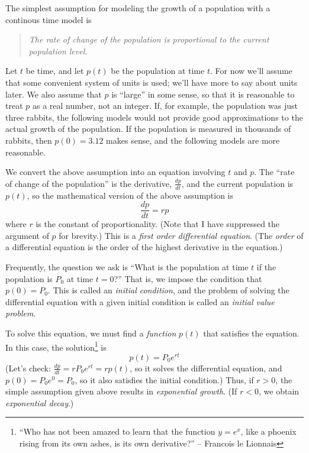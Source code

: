 \documentclass[reqno]{immbook}
\numberwithin{equation}{chapter}
\numberwithin{question}{section}
\numberwithin{theorem}{chapter}
\numberwithin{figure}{chapter}
\theoremstyle{definition}
\begin{document}
% 
% 
The simplest assumption for modeling the growth of a population
with a continous time model is
\begin{quote}
\emph{The rate of change of the population is proportional to the current population level.}
\end{quote} 
Let $t$ be time, and let $p(t)$ be the population at time $t$.
For now we'll assume that some convenient system of units is used;
we'll have more to say about units later.
We also assume that $p$ is ``large'' in some sense, so that it is reasonable
to treat $p$ as a real number, not an integer.
If, for example, the population was just three rabbits, the following
models would not provide good
approximations to the actual growth of the population.
If the population is measured in thousands of rabbits,
then $p(0)=3.12$ makes sense,
and the following models are more reasonable.

We convert the above assumption into an equation involving $t$
and $p$.
The ``rate of change of the population'' is the derivative, $\frac{dp}{dt}$, and the
current population is $p(t)$, so the mathematical version of the above
assumption is
\begin{equation}
  \frac{dp}{dt} = rp
\label{eqn:growth}
\end{equation}
where $r$ is the constant of proportionality.
(Note that I have suppressed the argument of $p$ for brevity.)
This is a \emph{first order differential equation}.
(The \emph{order} of a differential equation is the order of the
highest derivative in the equation.)

Frequently, the question we ask is ``What is the population at time $t$
if the population is $P_0$ at time $t=0$?''  That is, we impose the
condition that $p(0)=P_0$.  This is called an
\emph{initial condition}, and the problem of solving the differential
equation with a given initial condition is called an
\emph{initial value problem}.

To solve this equation, we must find a \emph{function} $p(t)$
that satisfies the equation.  In this case, the solution\footnote{%
``Who has not been amazed to learn that the function $y = e^x$, like a 
      phoenix rising from its own ashes, is its own derivative?'' 
       -- Francois le Lionnais
}
is
\begin{equation}
  p(t) = P_0 e^{rt}
\end{equation}
(Let's check:  $\frac{dp}{dt} = rP_0e^{rt} = r p(t)$, so  it solves the differential
equation, and $p(0) = P_0e^0 = P_0$, so it also satisfies the initial condition.)
Thus, if $r > 0$, the simple assumption given above results in
\emph{exponential growth}.
(If $r < 0$, we obtain \emph{exponential decay}.)
\end{document}
